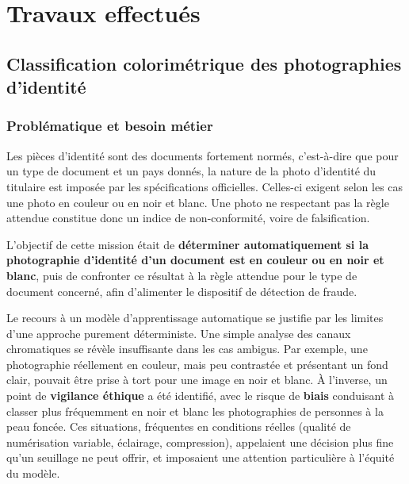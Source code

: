 \chapter{Travaux effectués}\label{ch:travaux}


\section{Classification colorimétrique des photographies d'identité}

\subsection{Problématique et besoin métier}

Les pièces d'identité sont des documents fortement normés, c'est-à-dire que pour un
type de document et un pays donnés, la nature de la photo d'identité du titulaire est
imposée par les spécifications officielles. Celles-ci exigent selon les cas une photo
en couleur ou en noir et blanc. Une photo ne respectant pas la règle attendue
constitue donc un indice de non-conformité, voire de falsification.

L'objectif de cette mission était de \textbf{déterminer automatiquement si la
photographie d'identité d'un document est en couleur ou en noir et blanc}, puis de
confronter ce résultat à la règle attendue pour le type de document concerné, afin
d'alimenter le dispositif de détection de fraude.

Le recours à un modèle d'apprentissage automatique se justifie par les limites d'une
approche purement déterministe. Une simple analyse des canaux chromatiques se révèle
insuffisante dans les cas ambigus. Par exemple, une photographie réellement en
couleur, mais peu contrastée et présentant un fond clair, pouvait être prise à tort
pour une image en noir et blanc. À l'inverse, un point de \textbf{vigilance éthique}
a été identifié, avec le risque de \textbf{biais} conduisant à classer plus
fréquemment en noir et blanc les photographies de personnes à la peau foncée. Ces
situations, fréquentes en conditions réelles (qualité de numérisation variable,
éclairage, compression), appelaient une décision plus fine qu'un seuillage ne peut
offrir, et imposaient une attention particulière à l'équité du modèle.

